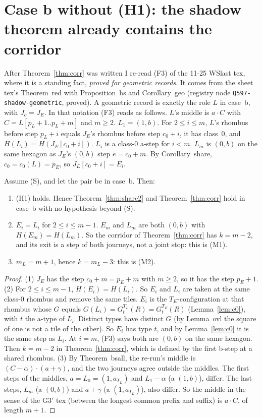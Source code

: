\documentclass[11pt]{article}
\theoremstyle{definition}\newtheorem{definition}[theorem]{Definition}\newtheorem{remark}[theorem]{Remark}
\begin{document}
\section{Case b without (H1): the shadow theorem already contains the corridor}\label{sec:shadow}
After Theorem~\ref{thm:corr} was written I re-read (F3) of the 11-25 WSlast tex, where it is a standing fact, \emph{proved for geometric records}. It comes from the sheet tex's Theorem~red with Proposition~hs and Corollary~geo (registry node \texttt{Q597-shadow-geometric}, proved). A geometric record is exactly the role $L$ in case~b, with $J_o=J_E$. In that notation (F3) reads as follows. $L$'s middle is $a\cdot C$ with $C=L[p_L+1..p_L+m]$ and $m\ge2$. $L_1=(1,b)$. For $2\le i\le m$, $L$'s rhombus before step $p_L+i$ equals $J_E$'s rhombus before step $c_0+i$, it has class~0, and $H(L_i)=H(J_E[c_0+i])$. $L_i$ is a class-0 a-step for $i<m$. $L_m$ is $(0,b)$ on the same hexagon as $J_E$'s $(0,b)$ step $e=c_0+m$. By Corollary~share, $c_0=c_0(L)=p_E$, so $J_E[c_0+i]=E_i$.
\begin{proposition}\label{prop:shadow}
Assume (S), and let the pair be in case~b. Then:
\begin{enumerate}
\item (H1) holds. Hence Theorem~\ref{thm:share2} and Theorem~\ref{thm:corr} hold in case~b with no hypothesis beyond (S).
\item $E_i=L_i$ for $2\le i\le m-1$. $E_m$ and $L_m$ are both $(0,b)$ with $H(E_m)=H(L_m)$. So the corridor of Theorem~\ref{thm:corr} has $k=m-2$, and its exit is a step of both journeys, not a joint stop: this is (M1).
\item $m_L=m+1$, hence $k=m_L-3$: this is (M2).
\end{enumerate}
\end{proposition}
\begin{proof}
(1) $J_E$ has the step $c_0+m=p_E+m$ with $m\ge2$, so it has the step $p_E+1$.
(2) For $2\le i\le m-1$, $H(E_i)=H(L_i)$. So $E_i$ and $L_i$ are taken at the same class-0 rhombus and remove the same tiles. $E_i$ is the $T_E$-configuration at that rhombus whose $G$ equals $G(L_i)=G^{T_L}_t(R)=G^{T_E}_t(R)$ (Lemma~\ref{lem:c0}), with $t$ the a-type of $L_i$. Distinct types have distinct $G$ (by Lemma~ovl the square of one is not a tile of the other). So $E_i$ has type $t$, and by Lemma~\ref{lem:c0} it is the same step as $L_i$. At $i=m$, (F3) says both are $(0,b)$ on the same hexagon. Then $k=m-2$ in Theorem~\ref{thm:corr}, which is defined by the first b-step at a shared rhombus.
(3) By Theorem~bsall, the re-run's middle is $(C-\alpha)\cdot(a+\gamma)$, and the two journeys agree outside the middles. The first steps of the middles, $a=L_0=(1,a_{T_L})$ and $L_1-\alpha$ (a $(1,b)$), differ. The last steps, $L_m$ (a $(0,b)$) and $a+\gamma$ (a $(1,a_{T_L})$), also differ. So the middle in the sense of the G3$'$ tex (between the longest common prefix and suffix) is $a\cdot C$, of length $m+1$.
\end{proof}
\end{document}
